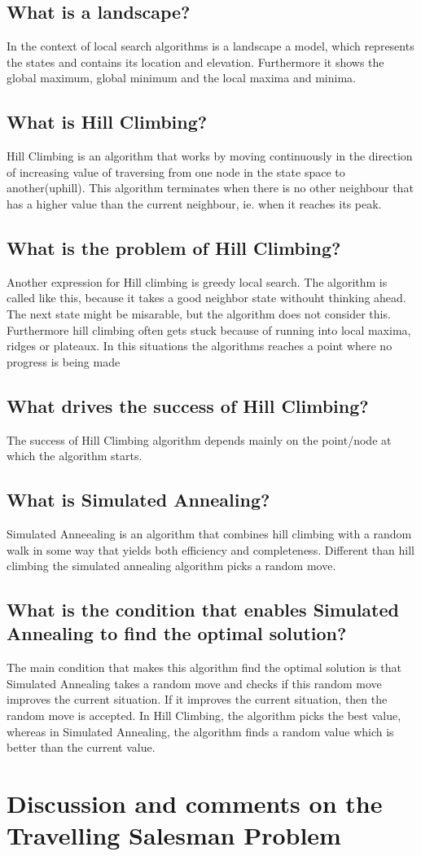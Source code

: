 \documentclass[11pt]{article}
\begin{document}
\subsection{What is a landscape?}
In the context of local search algorithms is a landscape a model, which represents the states and contains its location and elevation. Furthermore it shows the global maximum, global minimum and the local maxima and minima. 

\subsection{What is Hill Climbing?}
Hill Climbing is an algorithm that works by moving continuously in the direction of increasing value of traversing from one node in the state space to another(uphill). This algorithm terminates when there is no other neighbour that has a higher value than the current neighbour, ie. when it reaches its peak.

\subsection{What is the problem of Hill Climbing?}
Another expression for Hill climbing is greedy local search. The algorithm is called like this, because it takes a good neighbor state withouht thinking ahead. The next state might be misarable, but the algorithm does not consider this. Furthermore hill climbing often gets stuck because of running into local maxima, ridges or plateaux. In this situations the algorithms reaches a point where no progress is being made 

\subsection{What drives the success of Hill Climbing?}
The success of Hill Climbing algorithm depends mainly on the point/node at which the algorithm starts.

\subsection{What is Simulated Annealing?}
Simulated Anneealing is an algorithm that combines hill climbing with a random walk in some way that yields both efficiency and completeness. Different than hill climbing the simulated annealing algorithm picks a random move.

\subsection{What is the condition that enables Simulated Annealing to find
the optimal solution?}
The main condition that makes this algorithm find the optimal solution is that Simulated Annealing takes a random move and checks if this random move improves the current situation. If it improves the current situation, then the random move is accepted. In Hill Climbing, the algorithm picks the best value, whereas in Simulated Annealing, the algorithm finds a random value which is better than the current value. 

\newpage
\section{Discussion and comments on the Travelling Salesman Problem}
\end{document}
